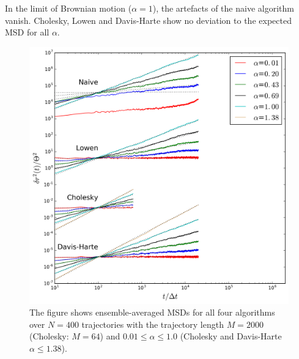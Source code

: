 \documentclass[
  a4paper,BCOR10mm,twoside,
  headsepline,footsepline,%
  fleqn,openbib
]{scrbook}
\begin{document}
In the limit of Brownian motion ($\alpha=1$), the artefacts of the naive algorithm  vanish. Cholesky, Lowen and Davis-Harte show no deviation to the expected MSD for all $\alpha$. \par
\begin{figure}[h!]
\centering
\includegraphics[width=\textwidth]{./data/alpha_changethreeneu.png}
\caption{The figure shows ensemble-averaged MSDs for all four algorithms over $N=400$ trajectories with the trajectory length $M=2000$ (Cholesky: $M=64$) and $0.01\leq\alpha\leq1.0$ (Cholesky and Davis-Harte $\alpha\leq1.38$).}
\label{alphachange}
\end{figure}
\end{document}
